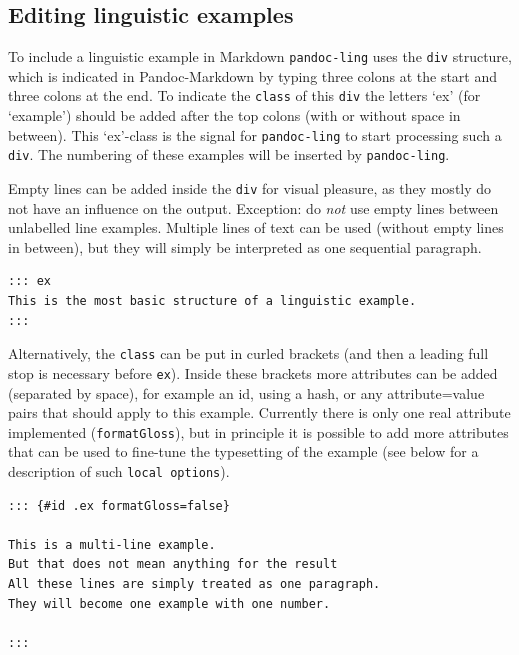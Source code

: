 \documentclass[
]{article}
\begin{document}
\hypertarget{editing-linguistic-examples}{%
\subsection{Editing linguistic
examples}\label{editing-linguistic-examples}}

To include a linguistic example in Markdown \texttt{pandoc-ling} uses
the \texttt{div} structure, which is indicated in Pandoc-Markdown by
typing three colons at the start and three colons at the end. To
indicate the \texttt{class} of this \texttt{div} the letters `ex' (for
`example') should be added after the top colons (with or without space
in between). This `ex'-class is the signal for \texttt{pandoc-ling} to
start processing such a \texttt{div}. The numbering of these examples
will be inserted by \texttt{pandoc-ling}.

Empty lines can be added inside the \texttt{div} for visual pleasure, as
they mostly do not have an influence on the output. Exception: do
\emph{not} use empty lines between unlabelled line examples. Multiple
lines of text can be used (without empty lines in between), but they
will simply be interpreted as one sequential paragraph.

\begin{verbatim}
::: ex
This is the most basic structure of a linguistic example. 
:::
\end{verbatim}

\begin{samepage}
\begin{exe} \judgewidth{}
  \label{ex4.1}
\end{exe}
\end{samepage}

Alternatively, the \texttt{class} can be put in curled brackets (and
then a leading full stop is necessary before \texttt{ex}). Inside these
brackets more attributes can be added (separated by space), for example
an id, using a hash, or any attribute=value pairs that should apply to
this example. Currently there is only one real attribute implemented
(\texttt{formatGloss}), but in principle it is possible to add more
attributes that can be used to fine-tune the typesetting of the example
(see below for a description of such \texttt{local\ options}).

\begin{verbatim}
::: {#id .ex formatGloss=false}

This is a multi-line example.
But that does not mean anything for the result
All these lines are simply treated as one paragraph.
They will become one example with one number.

:::
\end{verbatim}
\end{document}
